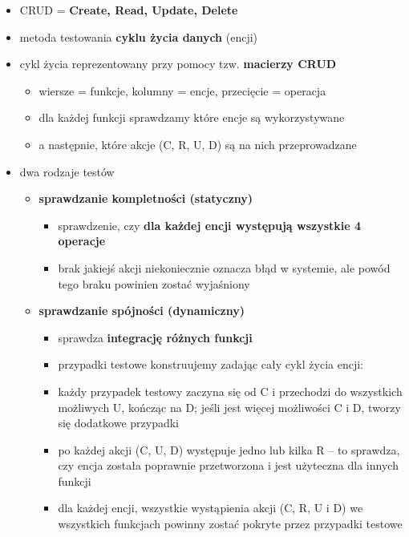 \documentclass[../main.tex]{subfiles}
\begin{document}
    \begin{itemize}
        \item CRUD = \textbf{Create, Read, Update, Delete}
        \item metoda testowania \textbf{cyklu życia danych} (encji)
        \item cykl życia reprezentowany przy pomocy tzw. \textbf{macierzy CRUD}
        \begin{itemize}
            \item wiersze = funkcje, kolumny = encje, przecięcie = operacja
            \item dla każdej funkcji sprawdzamy które encje są wykorzystywane
            \item a następnie, które akcje (C, R, U, D) są na nich przeprowadzane
        \end{itemize}
        \item dwa rodzaje testów
        \begin{itemize}
            \item \textbf{sprawdzanie kompletności (statyczny)}
            \begin{itemize}
                \item sprawdzenie, czy \textbf{dla każdej encji występują wszystkie 4 operacje}
                \item brak jakiejś akcji niekoniecznie oznacza błąd w systemie, ale powód tego braku powinien zostać wyjaśniony
            \end{itemize}
            \item \textbf{sprawdzanie spójności (dynamiczny)}
            \begin{itemize}
                \item sprawdza \textbf{integrację różnych funkcji}
                \item przypadki testowe konstruujemy zadając cały cykl życia encji:
                \item każdy przypadek testowy zaczyna się od C i przechodzi do
                wszystkich możliwych U, kończąc na D; jeśli jest więcej możliwości
                C i D, tworzy się dodatkowe przypadki
                \item po każdej akcji (C, U, D) występuje jedno lub kilka R – to sprawdza,
                czy encja została poprawnie przetworzona i jest użyteczna dla innych funkcji
                \item dla każdej encji, wszystkie wystąpienia akcji (C, R, U i D) we
                wszystkich funkcjach powinny zostać pokryte przez przypadki testowe
            \end{itemize}
        \end{itemize}
    \end{itemize}
\end{document}
